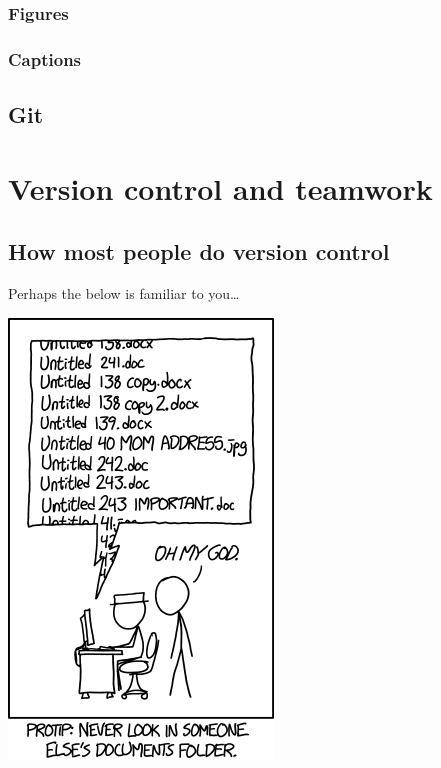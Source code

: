\documentclass[
]{book}
\begin{document}
\hypertarget{figures}{%
\section{Figures}\label{figures}}

\hypertarget{captions}{%
\section{Captions}\label{captions}}

\hypertarget{git}{%
\chapter{Git}\label{git}}

\hypertarget{part-version-control-and-teamwork}{%
\part{Version control and teamwork}\label{part-version-control-and-teamwork}}

\hypertarget{how-most-people-do-version-control}{%
\chapter*{How most people do version control}\label{how-most-people-do-version-control}}

Perhaps the below is familiar to you\ldots{}

\includegraphics{img/version_control.png}
\end{document}
